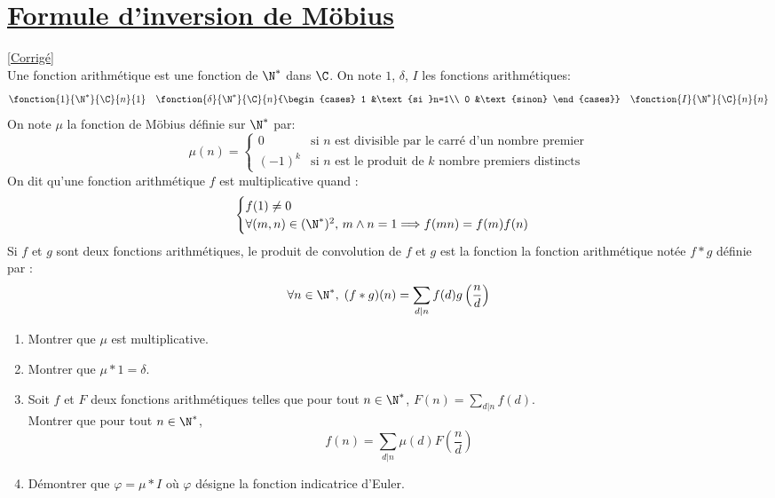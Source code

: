 \documentclass[8pt]{book}
\begin{document}
\section{\underline{Formule d'inversion de Möbius} }
\label{Formule d'inversion de Möbius}
\textcolor{blue}{\hyperref[Formule d'inversion de Möbius corrigé]{[Corrigé]}}\\
Une fonction arithmétique est une fonction de $\N^*$ dans $\C$.
On note $1$, $\delta$,  $I$ les fonctions arithmétiques: 
$$\fonction{1}{\N^*}{\C}{n}{1} \quad \fonction{\delta}{\N^*}{\C}{n}{\begin{cases}
		1 &\text{si }n=1\\
		0 &\text{sinon}
\end{cases}} \quad \fonction{I}{\N^*}{\C}{n}{n}$$
On note $\mu$ la fonction de Möbius définie sur $\N^*$ par:
$$\mu(n)=\begin{cases}
	0 & \mbox{si } n\mbox{ est divisible par le carré d'un nombre premier}\\
	(-1)^k & \mbox{si } n\mbox{ est le produit de } k\mbox{ nombre premiers distincts}
\end{cases}$$
On dit qu'une fonction arithmétique $f$ est multiplicative quand : $$\begin{cases}
	f(1)\ne0\\
	\forall (m,n)\in(\N^*)^2, \, m\wedge n=1 \Longrightarrow f(mn)=f(m)f(n)
\end{cases}$$
Si $f$ et $g$ sont deux fonctions arithmétiques, le produit de convolution de $f$ et $g$ est la fonction la fonction arithmétique notée $f*g$ définie par : $$\forall n \in\N^* ,\;(f*g)(n)=\sum_{d|n}f(d)g\left(\frac{n}{d}\right)$$
\begin{enumerate}
	\item Montrer que $\mu$ est multiplicative.
	\item Montrer que $\mu*1=\delta$.
	\item Soit $f$ et $F$ deux fonctions arithmétiques telles que pour tout $n\in\N^*$, $\displaystyle F(n)=\sum_{d|n}f(d)$.
	\\ Montrer que pour tout $n\in\N^*$, $$f(n)=\sum_{d|n}\mu(d)F\left(\frac{n}{d}\right)$$
	\item Démontrer que $\varphi=\mu*I$ où $\varphi$ désigne la fonction indicatrice d'Euler.
\end{enumerate}
\end{document}
